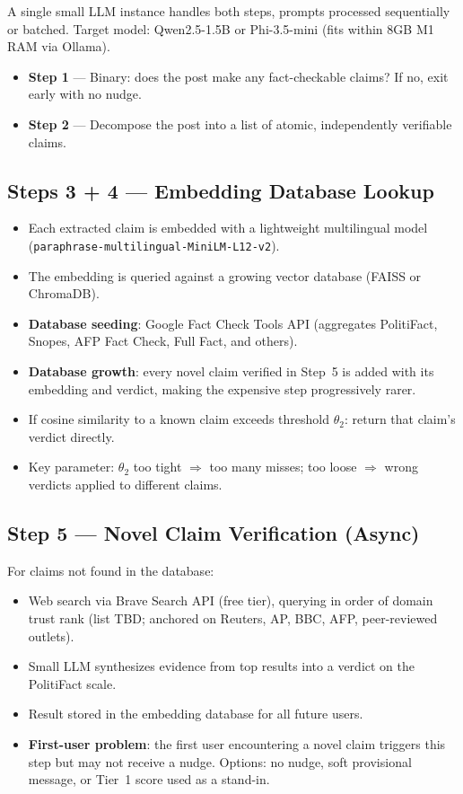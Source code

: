 A single small LLM instance handles both steps, prompts processed sequentially or batched.
Target model: Qwen2.5-1.5B or Phi-3.5-mini (fits within 8GB M1 RAM via Ollama).

\begin{itemize}
  \item \textbf{Step 1} --- Binary: does the post make any fact-checkable claims? If no, exit early with no nudge.
  \item \textbf{Step 2} --- Decompose the post into a list of atomic, independently verifiable claims.
\end{itemize}

\subsection{Steps 3 + 4 --- Embedding Database Lookup}

\begin{itemize}
  \item Each extracted claim is embedded with a lightweight multilingual model (\texttt{paraphrase-multilingual-MiniLM-L12-v2}).
  \item The embedding is queried against a growing vector database (FAISS or ChromaDB).
  \item \textbf{Database seeding}: Google Fact Check Tools API (aggregates PolitiFact, Snopes, AFP Fact Check, Full Fact, and others).
  \item \textbf{Database growth}: every novel claim verified in Step~5 is added with its embedding and verdict, making the expensive step progressively rarer.
  \item If cosine similarity to a known claim exceeds threshold $\theta_2$: return that claim's verdict directly.
  \item Key parameter: $\theta_2$ too tight $\Rightarrow$ too many misses; too loose $\Rightarrow$ wrong verdicts applied to different claims.
\end{itemize}

\subsection{Step 5 --- Novel Claim Verification (Async)}

For claims not found in the database:
\begin{itemize}
  \item Web search via Brave Search API (free tier), querying in order of domain trust rank (list TBD; anchored on Reuters, AP, BBC, AFP, peer-reviewed outlets).
  \item Small LLM synthesizes evidence from top results into a verdict on the PolitiFact scale.
  \item Result stored in the embedding database for all future users.
  \item \textbf{First-user problem}: the first user encountering a novel claim triggers this step but may not receive a nudge. Options: no nudge, soft provisional message, or Tier~1 score used as a stand-in.
\end{itemize}

